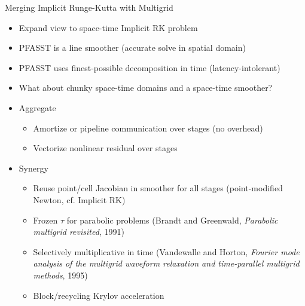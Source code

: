 \documentclass{beamer}
\begin{document}
\begin{frame}{Merging Implicit Runge-Kutta with Multigrid}
  \begin{itemize}
  \item Expand view to space-time Implicit RK problem
  \item PFASST is a line smoother (accurate solve in spatial domain)
  \item PFASST uses finest-possible decomposition in time (latency-intolerant)
  \item What about chunky space-time domains and a space-time smoother?
  \item \alert<2>{Aggregate}
    \begin{itemize}
    \item Amortize or pipeline communication over stages (no overhead)
    \item Vectorize nonlinear residual over stages
    \end{itemize}
  \item \alert<3>{Synergy}
    \begin{itemize}
    \item Reuse point/cell Jacobian in smoother for all stages (point-modified Newton, cf. Implicit RK)
    \item Frozen $\tau$ for parabolic problems (Brandt and Greenwald, \emph{Parabolic multigrid revisited}, 1991)
    \item Selectively multiplicative in time (Vandewalle and Horton, \emph{Fourier mode analysis of the multigrid waveform relaxation and time-parallel multigrid methods}, 1995)
    \item Block/recycling Krylov acceleration
    \end{itemize}
  \end{itemize}
\end{frame}

\end{document}

